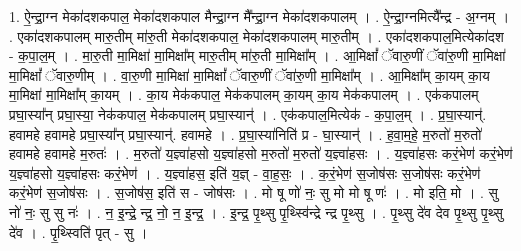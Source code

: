 \documentclass[17pt]{extarticle}
\begin{document}
1. ऐ॒न्द्रा॒ग्न मेका॑दशकपाल॒ मेका॑दशकपाल मैन्द्रा॒ग्न मै᳚न्द्रा॒ग्न मेका॑दशकपालम् । . ऐ॒न्द्रा॒ग्नमित्यै᳚न्द्र - अ॒ग्नम् । . एका॑दशकपालम् मारु॒तीम् मा॑रु॒ती मेका॑दशकपाल॒ मेका॑दशकपालम् मारु॒तीम् । . एका॑दशकपाल॒मित्येका॑दश - क॒पा॒ल॒म् । . मा॒रु॒ती मा॒मिक्षा॑ मा॒मिक्षा᳚म् मारु॒तीम् मा॑रु॒ती मा॒मिक्षा᳚म् । . आ॒मिक्षां᳚ ॅवारु॒णीं ॅवा॑रु॒णी मा॒मिक्षा॑ मा॒मिक्षां᳚ ॅवारु॒णीम् । . वा॒रु॒णी मा॒मिक्षा॑ मा॒मिक्षां᳚ ॅवारु॒णीं ॅवा॑रु॒णी मा॒मिक्षा᳚म् । . आ॒मिक्षा᳚म् का॒यम् का॒य मा॒मिक्षा॑ मा॒मिक्षा᳚म् का॒यम् । . का॒य मेक॑कपाल॒ मेक॑कपालम् का॒यम् का॒य मेक॑कपालम् । . एक॑कपालम् प्रघा॒स्या᳚न् प्रघा॒स्या॒ नेक॑कपाल॒ मेक॑कपालम् प्रघा॒स्यान्॑ । . एक॑कपाल॒मित्येक॑ - क॒पा॒ल॒म् । . प्र॒घा॒स्यान्॑. हवामहे हवामहे प्रघा॒स्या᳚न् प्रघा॒स्यान्॑. हवामहे । . प्र॒घा॒स्या॑निति॑ प्र - घा॒स्यान्॑ । . ह॒वा॒म॒हे॒ म॒रुतो॑ म॒रुतो॑ हवामहे हवामहे म॒रुतः॑ । . म॒रुतो॑ य॒ज्ञ्वा॑हसो य॒ज्ञ्वा॑हसो म॒रुतो॑ म॒रुतो॑ य॒ज्ञ्वा॑हसः । . य॒ज्ञ्वा॑हसः करं॒भेण॑ करं॒भेण॑ य॒ज्ञ्वा॑हसो य॒ज्ञ्वा॑हसः करं॒भेण॑ । . य॒ज्ञ्वा॑हस॒ इति॑ य॒ज्ञ् - वा॒ह॒सः॒ । . क॒रं॒भेण॑ स॒जोष॑सः स॒जोष॑सः करं॒भेण॑ करं॒भेण॑ स॒जोष॑सः । . स॒जोष॑स॒ इति॑ स - जोष॑सः । . मो षू णो॑ नः॒ सु मो मो षू णः॑ । . मो इति॒ मो । . सु नो॑ नः॒ सु सु नः॑ । . न॒ इ॒न्द्रे॒ न्द्र॒ नो॒ न॒ इ॒न्द्र॒ । . इ॒न्द्र॒ पृ॒थ्सु पृ॒थ्स्वि॑न्द्रे न्द्र पृ॒थ्सु । . पृ॒थ्सु दे॑व देव पृ॒थ्सु पृ॒थ्सु दे॑व । . पृ॒थ्स्विति॑ पृत् - सु । \newline
\end{document}
